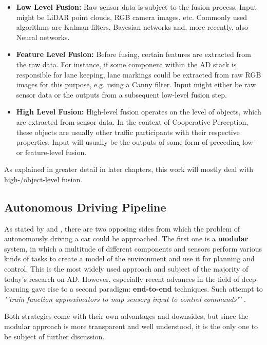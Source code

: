 \begin{itemize}
	\item \textbf{Low Level Fusion:} Raw sensor data is subject to the fusion process. Input might be LiDAR point clouds, RGB camera images, etc. Commonly used algorithms are Kalman filters, Bayesian networks and, more recently, also Neural networks.
	\item \textbf{Feature Level Fusion:} Before fusing, certain features are extracted from the raw data. For instance, if some component within the AD stack is responsible for lane keeping, lane markings could be extracted from raw RGB images for this purpose, e.g. using a Canny filter. Input might either be raw sensor data or the outputs from a subsequent low-level fusion step.
	\item \textbf{High Level Fusion:} High-level fusion operates on the level of objects, which are extracted from sensor data. In the context of Cooperative Perception, these objects are usually other traffic participants with their respective properties. Input will usually be the outputs of some form of preceding low- or feature-level fusion.
\end{itemize}

As explained in greater detail in later chapters, this work will mostly deal with high-/object-level fusion. 


\subsection{Autonomous Driving Pipeline}
\label{subsec:background:autonomous_driving_pipeline}

As stated by \cite{Codevilla2018} and \cite{Friedman2019}, there are two opposing sides from which the problem of autonomously driving a car could be approached. The first one is a \textbf{modular} system, in which a multitude of different components and sensors perform various kinds of tasks to create a model of the environment and use it for planning and control. This is the most widely used approach and subject of the majority of today's research on AD. However, especially recent advances in the field of deep-learning gave rise to a second paradigm: \textbf{end-to-end} techniques. Such attempt to \textit{"'train function approximators to map sensory input to control commands"'} \cite{Codevilla2018}.

Both strategies come with their own advantages and downsides, but since the modular approach is more transparent and well understood, it is the only one to be subject of further discussion.

